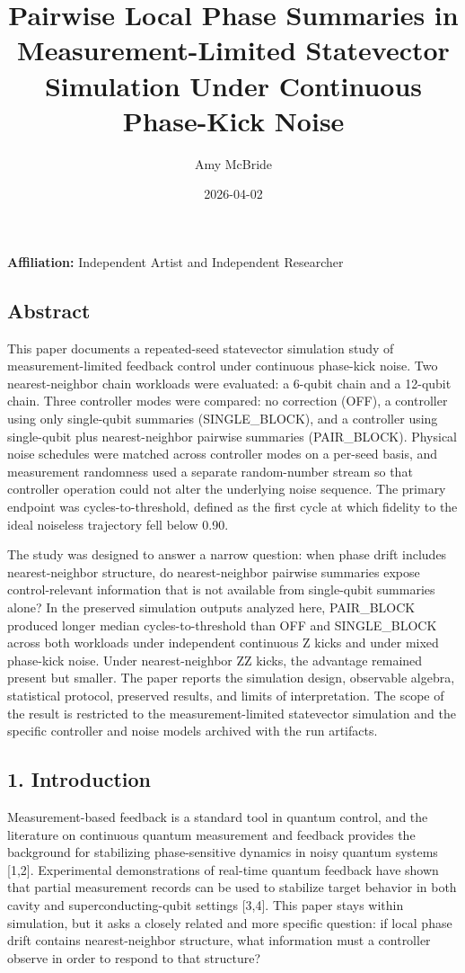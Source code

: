 \documentclass[
]{article}
\title{Pairwise Local Phase Summaries in Measurement-Limited Statevector
Simulation Under Continuous Phase-Kick Noise}
\author{Amy McBride}
\date{2026-04-02}
\begin{document}
\maketitle

\textbf{Affiliation:} Independent Artist and Independent Researcher

\subsection{Abstract}\label{abstract}

This paper documents a repeated-seed statevector simulation study of
measurement-limited feedback control under continuous phase-kick noise.
Two nearest-neighbor chain workloads were evaluated: a 6-qubit chain and
a 12-qubit chain. Three controller modes were compared: no correction
(OFF), a controller using only single-qubit summaries (SINGLE\_BLOCK),
and a controller using single-qubit plus nearest-neighbor pairwise
summaries (PAIR\_BLOCK). Physical noise schedules were matched across
controller modes on a per-seed basis, and measurement randomness used a
separate random-number stream so that controller operation could not
alter the underlying noise sequence. The primary endpoint was
cycles-to-threshold, defined as the first cycle at which fidelity to the
ideal noiseless trajectory fell below 0.90.

The study was designed to answer a narrow question: when phase drift
includes nearest-neighbor structure, do nearest-neighbor pairwise
summaries expose control-relevant information that is not available from
single-qubit summaries alone? In the preserved simulation outputs
analyzed here, PAIR\_BLOCK produced longer median cycles-to-threshold
than OFF and SINGLE\_BLOCK across both workloads under independent
continuous Z kicks and under mixed phase-kick noise. Under
nearest-neighbor ZZ kicks, the advantage remained present but smaller.
The paper reports the simulation design, observable algebra, statistical
protocol, preserved results, and limits of interpretation. The scope of
the result is restricted to the measurement-limited statevector
simulation and the specific controller and noise models archived with
the run artifacts.

\subsection{1. Introduction}\label{introduction}

Measurement-based feedback is a standard tool in quantum control, and
the literature on continuous quantum measurement and feedback provides
the background for stabilizing phase-sensitive dynamics in noisy quantum
systems {[}1,2{]}. Experimental demonstrations of real-time quantum
feedback have shown that partial measurement records can be used to
stabilize target behavior in both cavity and superconducting-qubit
settings {[}3,4{]}. This paper stays within simulation, but it asks a
closely related and more specific question: if local phase drift
contains nearest-neighbor structure, what information must a controller
observe in order to respond to that structure?
\end{document}
